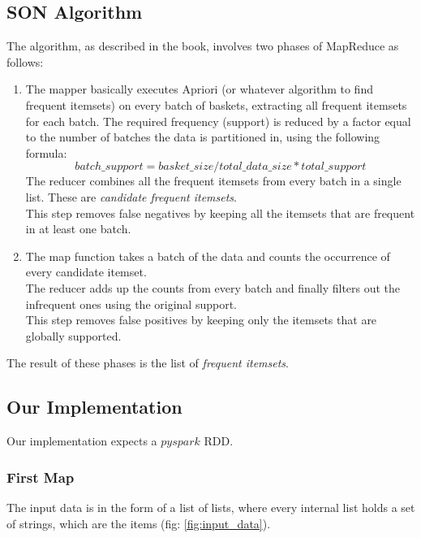 \documentclass[a4paper]{article}
\begin{document}
	\subsection{SON Algorithm}	
	The algorithm, as described in the book, involves two phases of MapReduce as follows:
	\begin{enumerate}
	\item The mapper basically executes Apriori (or whatever algorithm to find frequent itemsets) on every batch of baskets, extracting all frequent itemsets for each batch. The required frequency (support) is reduced by a factor equal to the number of batches the data is partitioned in, using the following formula:
	\[ batch\_support = basket\_size / total\_data\_size * total\_support \]
	The reducer combines all the frequent itemsets from every batch in a single list. These are \textit{candidate frequent itemsets}.\\
	This step removes false negatives by keeping all the itemsets that are frequent in at least one batch.
	\item The map function takes a batch of the data and counts the occurrence of every candidate itemset.\\
	The reducer adds up the counts from every batch and finally filters out the infrequent ones using the original support.\\
	This step removes false positives by keeping only the itemsets that are globally supported.
	\end{enumerate}
	The result of these phases is the list of \textit{frequent itemsets}.
	
	\subsection{Our Implementation}
	Our implementation expects a $pyspark$ RDD.
	
	\subsubsection{First Map}
	The input data is in the form of a list of lists, where every internal list holds a set of strings, which are the items (fig: \ref{fig:input_data}).
	
\end{document}
